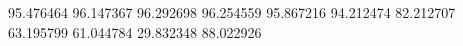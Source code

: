 95.476464
96.147367
96.292698
96.254559
95.867216
94.212474
82.212707
63.195799
61.044784
29.832348
88.022926

